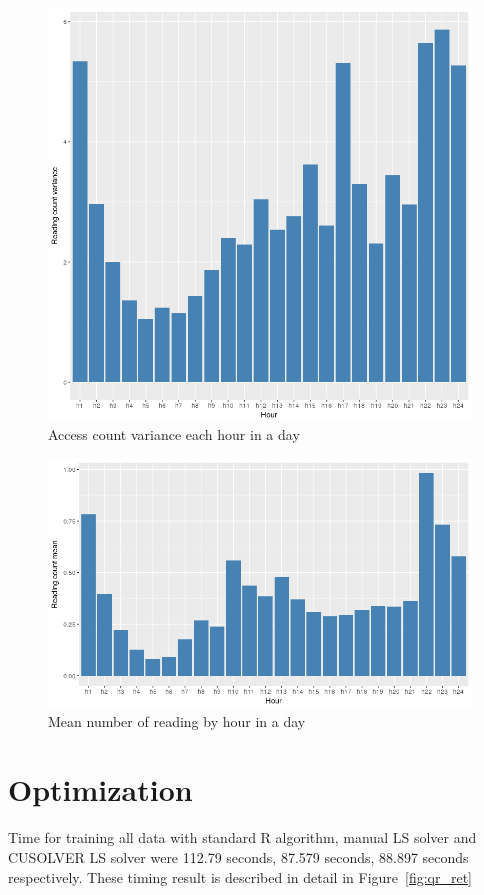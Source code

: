 \documentclass[English]{dicomopapers}
\begin{document}
\begin{figure}[ht]
  \centering
  \includegraphics[width=\columnwidth,natwidth=827,natheight=805]{access_var.png}
  \caption{Access count variance each hour in a day}\label{fig:access_var}
\end{figure}
\begin{figure}[ht]
  \centering
  \includegraphics[width=\columnwidth,natwidth=827,natheight=484]{access_mean.png}
  \caption{Mean number of reading by hour in a day}\label{fig:access_mean}
\end{figure}
\section{Optimization}
Time for training all data with standard R algorithm, manual LS solver and CUSOLVER LS solver were 112.79 seconds, 87.579 seconds, 88.897 seconds respectively. These timing result is described in detail in Figure~\ref{fig:qr_ret}\newline
\end{document}

